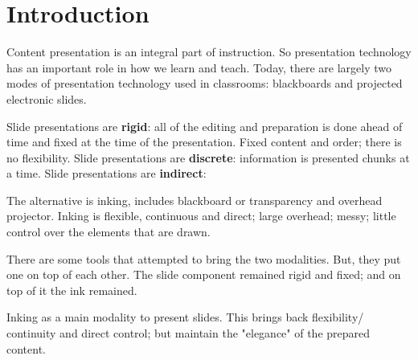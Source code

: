 \section{Introduction}

Content presentation is an integral part of instruction. So presentation technology has an important role in how we learn and teach. Today, there are largely two modes of presentation technology used in classrooms: blackboards and projected electronic slides. 

Slide presentations are \textbf{rigid}: all of the editing and preparation is done ahead of time and fixed at the time of the presentation. Fixed content and order; there is no flexibility.
Slide presentations are \textbf{discrete}: information is presented chunks at a time. 
Slide presentations are \textbf{indirect}: 

The alternative is inking, includes blackboard or transparency and overhead projector. 
Inking is flexible, continuous and direct; large overhead; messy; little control over the elements that are drawn.

There are some tools \cite{ClassroomPresenter} that attempted to bring the two modalities. But, they put one on top of each other. The slide component remained rigid and fixed; and on top of it the ink remained.

Inking as a main modality to present slides. This brings back flexibility/ continuity and direct control; but maintain the "elegance" of the prepared content.  

